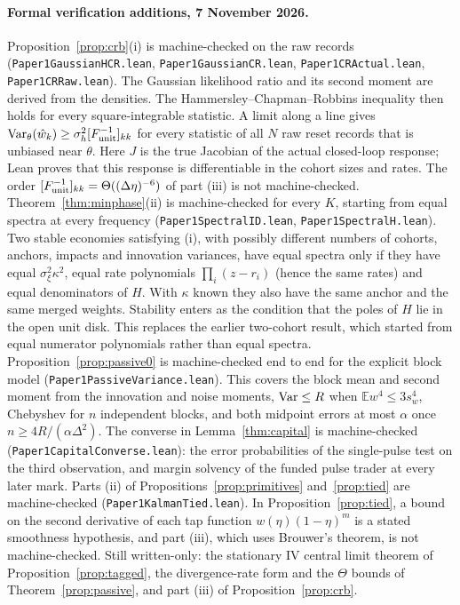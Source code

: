 \documentclass[12pt]{article}
\theoremstyle{definition}
\theoremstyle{remark}
\newcommand{\E}{\mathbb{E}}
\begin{document}
\paragraph{Formal verification additions, 7 November 2026.} Proposition~\ref{prop:crb}(i) is machine-checked on the raw records (\nolinkurl{Paper1GaussianHCR.lean}, \nolinkurl{Paper1GaussianCR.lean}, \nolinkurl{Paper1CRActual.lean}, \nolinkurl{Paper1CRRaw.lean}). The Gaussian likelihood ratio and its second moment are derived from the densities. The Hammersley--Chapman--Robbins inequality then holds for every square-integrable statistic. A limit along a line gives ${\rm Var}_\theta(\hat w_k)\ge\sigma_h^2[F_{\rm unit}^{-1}]_{kk}$ for every statistic of all $N$ raw reset records that is unbiased near $\theta$. Here $J$ is the true Jacobian of the actual closed-loop response; Lean proves that this response is differentiable in the cohort sizes and rates. The order $[F_{\rm unit}^{-1}]_{kk}=\Theta((\Delta\eta)^{-6})$ of part (iii) is not machine-checked. Theorem~\ref{thm:minphase}(ii) is machine-checked for every $K$, starting from equal spectra at every frequency (\nolinkurl{Paper1SpectralID.lean}, \nolinkurl{Paper1SpectralH.lean}). Two stable economies satisfying (i), with possibly different numbers of cohorts, anchors, impacts and innovation variances, have equal spectra only if they have equal $\sigma_\xi^2\kappa^2$, equal rate polynomials $\prod_i(z-r_i)$ (hence the same rates) and equal denominators of $H$. With $\kappa$ known they also have the same anchor and the same merged weights. Stability enters as the condition that the poles of $H$ lie in the open unit disk. This replaces the earlier two-cohort result, which started from equal numerator polynomials rather than equal spectra. Proposition~\ref{prop:passive0} is machine-checked end to end for the explicit block model (\nolinkurl{Paper1PassiveVariance.lean}). This covers the block mean and second moment from the innovation and noise moments, ${\rm Var}\le R$ when $\E w^4\le3s_w^4$, Chebyshev for $n$ independent blocks, and both midpoint errors at most $\alpha$ once $n\ge4R/(\alpha\Delta^2)$. The converse in Lemma~\ref{thm:capital} is machine-checked (\nolinkurl{Paper1CapitalConverse.lean}): the error probabilities of the single-pulse test on the third observation, and margin solvency of the funded pulse trader at every later mark. Parts (ii) of Propositions~\ref{prop:primitives} and~\ref{prop:tied} are machine-checked (\nolinkurl{Paper1KalmanTied.lean}). In Proposition~\ref{prop:tied}, a bound on the second derivative of each tap function $w(\eta)(1-\eta)^m$ is a stated smoothness hypothesis, and part (iii), which uses Brouwer's theorem, is not machine-checked. Still written-only: the stationary IV central limit theorem of Proposition~\ref{prop:tagged}, the divergence-rate form and the $\Theta$ bounds of Theorem~\ref{prop:passive}, and part (iii) of Proposition~\ref{prop:crb}.
\end{document}
